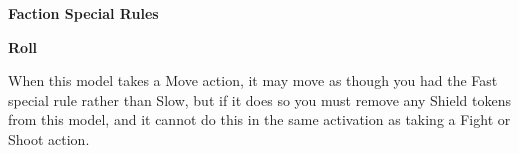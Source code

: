 \documentclass{article}
\begin{document}
\begin{multicols}{2}
{\vspace{0.6cm}
\setlength\extrarowheight{1.5pt}


\vspace{0.6cm}
\setlength\extrarowheight{1.5pt}


\vspace{0.6cm}
\setlength\extrarowheight{1.5pt}


\vspace{0.6cm}

\setlength\extrarowheight{1.5pt}


}
\end{multicols}
\vspace{0.6cm}

{\large \textbf{Faction Special Rules}}
\vspace{0.3cm}
\begin{multicols}{2}
    {\scriptsize

    \begin{minipage}{9cm}
        {\normalsize \textbf{Roll}}
        \vspace{0.3cm}

        When this model takes a Move action, it may move as though
        you had the Fast special rule rather than Slow, but if it does
        so you must remove any Shield tokens from this model, and it
        cannot do this in the same activation as taking a Fight or
        Shoot action.
    \end{minipage}

    }
\end{multicols}
\end{document}
